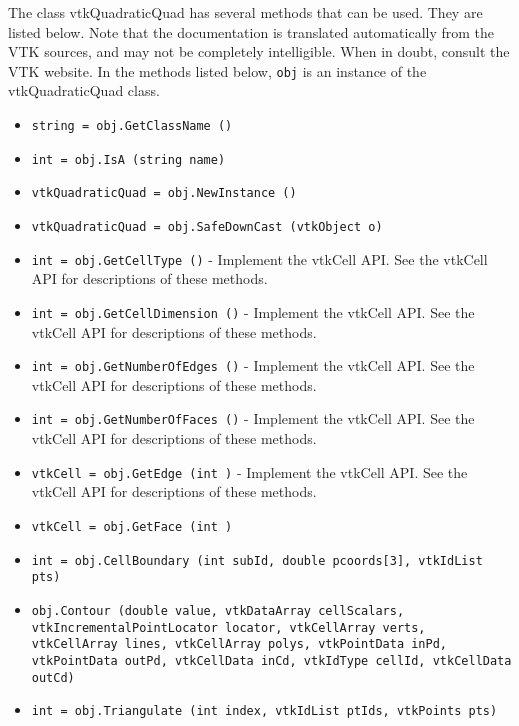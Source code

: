 The class vtkQuadraticQuad has several methods that can be used.
  They are listed below.
Note that the documentation is translated automatically from the VTK sources,
and may not be completely intelligible.  When in doubt, consult the VTK website.
In the methods listed below, \verb|obj| is an instance of the vtkQuadraticQuad class.
\begin{itemize}
\item  \verb|string = obj.GetClassName ()|

\item  \verb|int = obj.IsA (string name)|

\item  \verb|vtkQuadraticQuad = obj.NewInstance ()|

\item  \verb|vtkQuadraticQuad = obj.SafeDownCast (vtkObject o)|

\item  \verb|int = obj.GetCellType ()| -  Implement the vtkCell API. See the vtkCell API for descriptions
 of these methods.

\item  \verb|int = obj.GetCellDimension ()| -  Implement the vtkCell API. See the vtkCell API for descriptions
 of these methods.

\item  \verb|int = obj.GetNumberOfEdges ()| -  Implement the vtkCell API. See the vtkCell API for descriptions
 of these methods.

\item  \verb|int = obj.GetNumberOfFaces ()| -  Implement the vtkCell API. See the vtkCell API for descriptions
 of these methods.

\item  \verb|vtkCell = obj.GetEdge (int )| -  Implement the vtkCell API. See the vtkCell API for descriptions
 of these methods.

\item  \verb|vtkCell = obj.GetFace (int )|

\item  \verb|int = obj.CellBoundary (int subId, double pcoords[3], vtkIdList pts)|

\item  \verb|obj.Contour (double value, vtkDataArray cellScalars, vtkIncrementalPointLocator locator, vtkCellArray verts, vtkCellArray lines, vtkCellArray polys, vtkPointData inPd, vtkPointData outPd, vtkCellData inCd, vtkIdType cellId, vtkCellData outCd)|

\item  \verb|int = obj.Triangulate (int index, vtkIdList ptIds, vtkPoints pts)|


\end{itemize}

